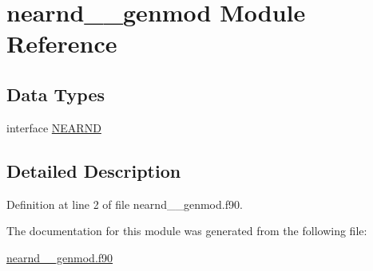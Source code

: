 \hypertarget{classnearnd____genmod}{\section{nearnd\+\_\+\+\_\+genmod Module Reference}
\label{classnearnd____genmod}
}
\subsection*{Data Types}
\begin{DoxyCompactItemize}
\item 
interface \hyperlink{interfacenearnd____genmod_1_1NEARND}{N\+E\+A\+R\+N\+D}
\end{DoxyCompactItemize}


\subsection{Detailed Description}


Definition at line 2 of file nearnd\+\_\+\+\_\+genmod.\+f90.



The documentation for this module was generated from the following file\+:\begin{DoxyCompactItemize}
\item 
\hyperlink{nearnd____genmod_8f90}{nearnd\+\_\+\+\_\+genmod.\+f90}\end{DoxyCompactItemize}
